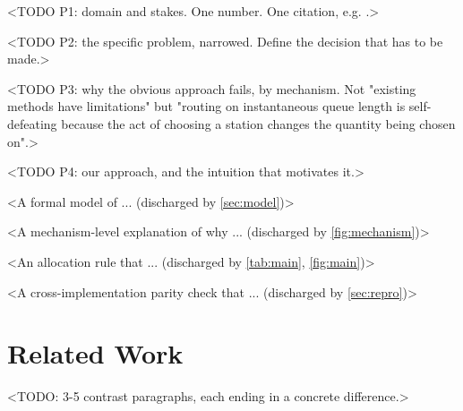 \documentclass[10pt]{article}
\begin{document}
<TODO P1: domain and stakes. One number. One citation, e.g. \citep{helbing1995social}.>

<TODO P2: the specific problem, narrowed. Define the decision that has to be made.>

<TODO P3: why the obvious approach fails, by mechanism. Not "existing methods have
limitations" but "routing on instantaneous queue length is self-defeating because
the act of choosing a station changes the quantity being chosen on".>

<TODO P4: our approach, and the intuition that motivates it.>

\begin{csfcontrib}
\begin{csfcontribs}
  \item <A formal model of ... (discharged by \cref{sec:model})>
  \item <A mechanism-level explanation of why ... (discharged by \cref{fig:mechanism})>
  \item <An allocation rule that ... (discharged by \cref{tab:main}, \cref{fig:main})>
  \item <A cross-implementation parity check that ... (discharged by \cref{sec:repro})>
\end{csfcontribs}
\end{csfcontrib}

\section{Related Work}

<TODO: 3-5 contrast paragraphs, each ending in a concrete difference.>
\end{document}
